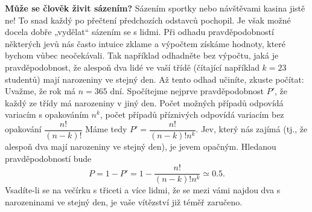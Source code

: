 \begin{mdframed}[style=mdexam]
  \begin{example}\label{mai:exam063}
    \textbf{Může se člověk živit sázením?}\newline
    Sázením sportky nebo návštěvami kasina jistě ne! To snad každý po přečtení předchozích odstavců
    pochopil. Je však možné docela dobře „vydělat“ sázením se s lidmi. Při odhadu pravděpodobností
    některých jevů nás často intuice zklame a výpočtem získáme hodnoty, které bychom vůbec
    neočekávali. Tak například odhadněte bez výpočtu, jaká je pravděpodobnost, že alespoň dva lidé
    ve vaší třídě (čítající například \(k = 23\) studentů) mají narozeniny ve stejný den. Až tento
    odhad učiníte, zkuste počítat: Uvažme, že rok má \(n = 365\) dní. Spočítejme nejprve
    pravděpodobnost \(P'\), že každý ze třídy má narozeniny v jiný den. Počet možných případů
    odpovídá variacím s opakováním \(n^k\), počet případů příznivých odpovídá variacím bez opakování
    \(\dfrac{n!}{(n-k)!}\) Máme tedy \(P'=\dfrac{n!}{(n-k)!n^k}\). Jev, který nás zajímá (tj., že
    alespoň dva mají narozeniny ve stejný den), je jevem opačným. Hledanou pravděpodobností bude
    \begin{equation*}
      P  = 1 - P' = 1 - \dfrac{n!}{(n - k)!n^k} \simeq \num{0.5}.
    \end{equation*}
    Vsadíte-li se na večírku s třiceti a více lidmi, že se mezi vámi najdou dva s narozeninami ve
    stejný den, je vaše vítězství již téměř zaručeno.
  \end{example}
\end{mdframed}